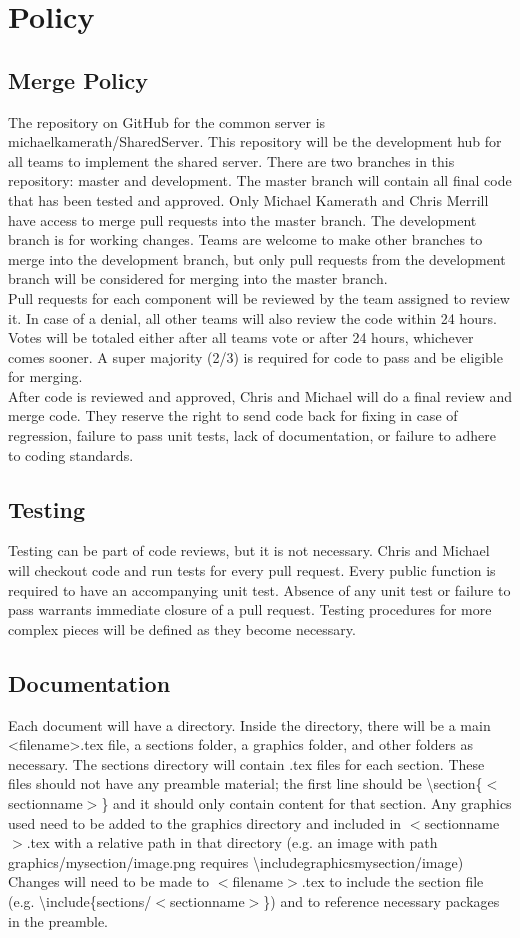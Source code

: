 \section*{Policy}
\subsection*{Merge Policy}
The repository on GitHub for the common server is michaelkamerath/SharedServer. This repository will be the development hub for all teams to implement the shared server. There are two branches in this repository: master and development. The master branch will contain all final code that has been tested and approved. Only Michael Kamerath and Chris Merrill have access to merge pull requests into the master branch. The development branch is for working changes. Teams are welcome to make other branches to merge into the development branch, but only pull requests from the development branch will be considered for merging into the master branch.\\
Pull requests for each component will be reviewed by the team assigned to review it. In case of a denial, all other teams will also review the code within 24 hours. Votes will be totaled either after all teams vote or after 24 hours, whichever comes sooner. A super majority (2/3) is required for code to pass and be eligible for merging.\\
After code is reviewed and approved, Chris and Michael will do a final review and merge code. They reserve the right to send code back for fixing in case of regression, failure to pass unit tests, lack of documentation, or failure to adhere to coding standards.
\subsection*{Testing}
Testing can be part of code reviews, but it is not necessary. Chris and Michael will checkout code and run tests for every pull request. Every public function is required to have an accompanying unit test. Absence of any unit test or failure to pass warrants immediate closure of a pull request. Testing procedures for more complex pieces will be defined as they become necessary.
\subsection*{Documentation}
Each document will have a directory. Inside the directory, there will be a main <filename>.tex file, a sections folder, a graphics folder, and other folders as necessary. The sections directory will contain .tex files for each section. These files should not have any preamble material; the first line should be \textbackslash section\{$<$sectionname$>$\} and it should only contain content for that section. Any graphics used need to be added to the graphics directory and included in $<$sectionname$>$.tex with a relative path in that directory (e.g. an image with path graphics/mysection/image.png requires \textbackslash includegraphics{mysection/image}) Changes will need to be made to $<$filename$>$.tex to include the section file (e.g. \textbackslash include\{sections/$<$sectionname$>$\}) and to reference necessary packages in the preamble.
